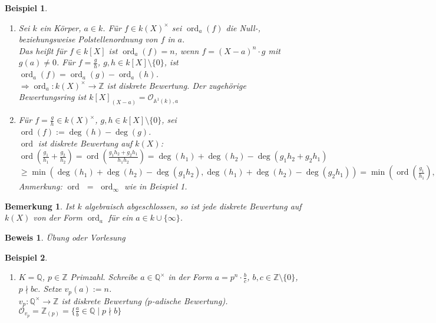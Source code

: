\documentclass[a4paper,12pt]{report}
\theoremstyle{break}
\newtheorem{Bem}[Def]{Bemerkung}
\theoremstyle{nonumberbreak}
\newtheorem{nnBsp}{Beispiel}
\newtheorem{Bew}{Beweis}
\theoremstyle{nonumberplain}
\newcommand{\quot}[1]{\textrm{\glqq}{#1}\textrm{\grqq}}
\DeclareMathOperator{\ord}{ord}
\newcommand{\Z}{\mathbb{Z}}
\newcommand{\Q}{\mathbb{Q}}
\newcommand{\A}{\mathbb{A}}
\newcommand{\calO}{\mathcal{O}}
\begin{document}
\begin{nnBsp}\begin{enumerate}[1)]
\item
Sei $k$ ein K\"orper, $a\in k$. F\"ur $f\in k(X)^\times$ sei $\ord_a(f)$ die Null-, beziehungsweise Polstellenordnung von $f$ in $a$.\\
Das hei\ss t f\"ur $f\in k[X]$ ist $\ord_a(f)=n$, wenn $f=(X-a)^n\cdot g$ mit $g(a)\ne0$. F\"ur $f=\frac{g}{h}$, $g,h\in k[X]\setminus\{0\}$, ist $\ord_a(f)=\ord_a(g)-\ord_a(h)$.\\
$\Rightarrow \ord_a:k(X)^\times\to\Z$ ist diskrete Bewertung. Der zugeh\"orige Bewertungsring ist $k[X]_{(X-a)}=\calO_{\A^1(k),a}$
\item
	F\"ur $f=\frac{g}{h}\in k(X)^\times$, $g,h\in k[X]\setminus\{0\}$, sei $\ord(f):=\deg(h)-\deg(g)$.\\
	$\ord$ ist diskrete Bewertung auf $k(X)$:\\
	$\ord(\frac{g_1}{h_1}+\frac{g_2}{h_2})=\ord(\frac{g_1h_2+g_2h_1}{h_1h_2})=\deg(h_1)+\deg(h_2)-\deg(g_1h_2+g_2h_1)$\\
	$\ge \min(\deg(h_1)+\deg(h_2)-\deg(g_1h_2), \deg(h_1)+\deg(h_2)-\deg(g_2h_1))=\min(\ord(\frac{g_1}{h_1}),\ord(\frac{g_2}{h_2}))$\\
	\emph{Anmerkung:} $\ord$ \quot{$=$} $\ord_\infty$ wie in Beispiel 1.
\end{enumerate}\end{nnBsp}

\begin{Bem}
Ist $k$ algebraisch abgeschlossen, so ist jede diskrete Bewertung auf $k(X)$ von der Form $\ord_a$ f\"ur ein $a\in k\cup\{\infty\}$.
\end{Bem}

\begin{Bew}
\"Ubung oder Vorlesung
\end{Bew}

\begin{nnBsp}\begin{enumerate}[1)]\item[3)]
$K=\Q$, $p\in \Z$ Primzahl. Schreibe $a\in \Q^\times$ in der Form $a=p^n\cdot\frac{b}{c}$, $b,c\in\Z\setminus\{0\}$, $p\nmid bc$. Setze $v_p(a):=n$.\\
$v_p:\Q^\times\to\Z$ ist diskrete Bewertung (\quot{$p$-adische Bewertung}).\\
$\calO_{v_p}=\Z_{(p)}=\{\frac{a}{b}\in\Q\mid p\nmid b\}$
\end{enumerate}\end{nnBsp}
\end{document}
